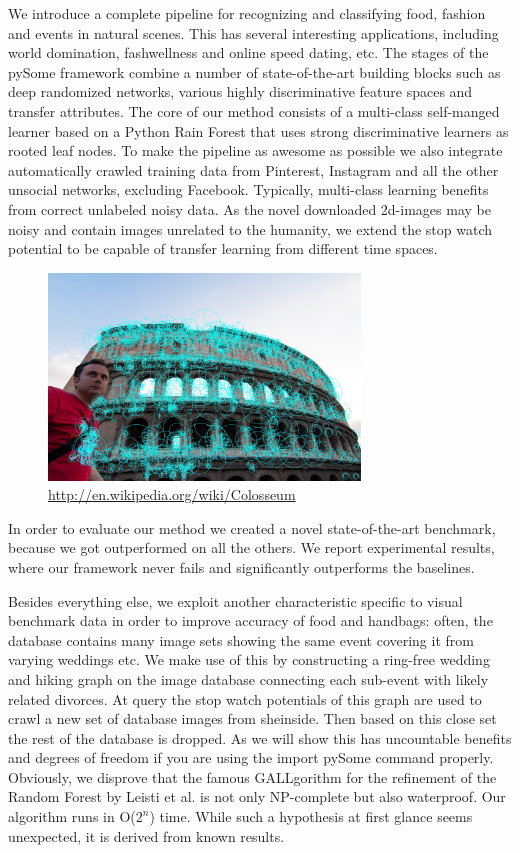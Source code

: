 \documentclass[runningheads]{llncs}
\begin{document}
We introduce a complete pipeline for recognizing and classifying food, fashion and events in natural scenes. 
This has several interesting applications, including world domination, fashwellness and online speed dating, etc. 
The stages of the pySome framework combine a number of state-of-the-art building blocks such as deep randomized networks, various highly discriminative feature spaces and transfer attributes. 
The core of our method consists of a multi-class self-manged learner based on a Python Rain Forest that uses strong discriminative learners as rooted leaf nodes. 
To make the pipeline as awesome as possible we also integrate automatically crawled training data from Pinterest, Instagram and all the other unsocial networks, excluding Facebook.
Typically, multi-class learning benefits from correct unlabeled noisy data. 
 As the novel downloaded 2d-images  may be noisy and contain images unrelated to the humanity, we extend the stop watch potential to be capable of transfer learning from different time spaces. 
  \begin{figure} \centering \includegraphics[height=5.5cm]{images/gabriele.jpg}
  \caption{\url{ http://en.wikipedia.org/wiki/Colosseum } } \label{fig:label0} \end{figure}
 In order to evaluate our method we created a novel state-of-the-art benchmark, because we got outperformed on all the others.  We report experimental results, where our framework never fails and significantly outperforms the baselines.

Besides everything else, we exploit another characteristic specific to visual benchmark data in order to improve accuracy of food and handbags:
often, the database contains many image sets showing the same event covering it from varying weddings etc. 
We make use of this by constructing a ring-free wedding and hiking graph on the image database connecting each sub-event  with likely related divorces.
 At query the stop watch potentials of this graph are used to crawl a new set of database images from sheinside. 
 Then based on this close set the rest of the database is dropped. 
 As we will show this has uncountable benefits and degrees of freedom if you are using the import pySome command properly.
 Obviously, we disprove that the famous GALLgorithm for the refinement of the
 Random Forest by Leisti et al. is not only NP-complete but also waterproof. Our algorithm runs in O($2^n$) time.
 While such a hypothesis at first glance seems unexpected, it is derived
 from known results.
\end{document}
